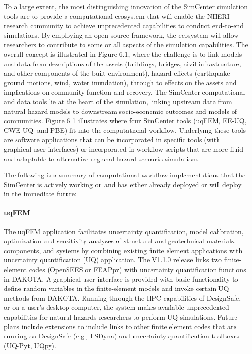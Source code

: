 To a large extent, the most distinguishing innovation of the SimCenter simulation tools are to provide a computational ecosystem that will enable the NHERI research community to achieve unprecedented capabilities to conduct end-to-end simulations. By employing an open-source framework, the ecosystem will allow researchers to contribute to some or all aspects of the simulation capabilities. The overall concept is illustrated in Figure 6.1, where the challenge is to link models and data from descriptions of the assets (buildings, bridges, civil infrastructure, and other components of the built environment), hazard effects (earthquake ground motions, wind, water inundation), through to effects on the assets and implications on community function and recovery. The SimCenter computational and data tools lie at the heart of the simulation, linking upstream data from natural hazard models to downstream socio-economic outcomes and models of communities. Figure 6 1 illustrates where four SimCenter tools (uqFEM, EE-UQ, CWE-UQ, and PBE) fit into the computational workflow. Underlying these tools are software applications that can be incorporated in specific tools (with graphical user interfaces) or incorporated in workflow scripts that are more fluid and adaptable to alternative regional hazard scenario simulations. 

The following is a summary of computational workflow implementations that the SimCenter is actively working on and has either already deployed or will deploy in the immediate future:

\paragraph{uqFEM} The uqFEM application facilitates uncertainty quantification, model calibration, optimization and sensitivity analyses of structural and geotechnical materials, components, and systems by combining existing finite element applications with uncertainty quantification (UQ) application. The V1.1.0 release links two finite-element codes (OpenSEES or FEAPpv) with uncertainty quantification functions in DAKOTA. A graphical user interface is provided with basic functionality to define random variables in the finite-element models and invoke certain UQ methods from DAKOTA. Running through the HPC capabilities of DesignSafe, or on a user’s desktop computer, the system makes available unprecedented capabilities for natural hazards researchers to perform UQ simulations. Future plans include extensions to include links to other finite element codes that are running on DesignSafe (e.g., LSDyna) and uncertainty quantification toolboxes (UQ-Pyt, UQpy).

